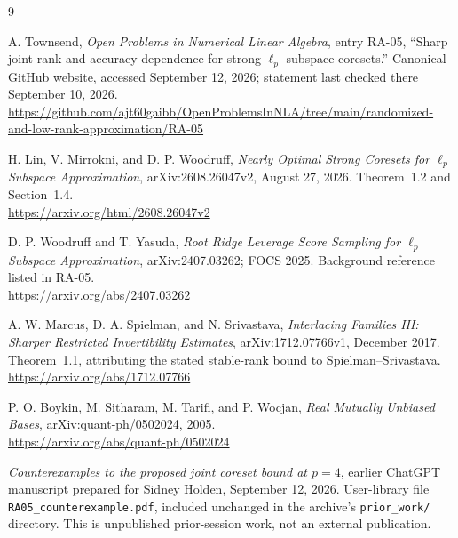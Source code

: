 \documentclass[11pt,letterpaper]{article}
\theoremstyle{definition}
\theoremstyle{remark}
\numberwithin{equation}{section}
\begin{document}
\begin{thebibliography}{9}\raggedright
{}
A. Townsend, \emph{Open Problems in Numerical Linear Algebra}, entry RA-05, ``Sharp joint rank and accuracy dependence for strong $\ell_p$ subspace coresets.'' Canonical GitHub website, accessed September 12, 2026; statement last checked there September 10, 2026.\\
\url{https://github.com/ajt60gaibb/OpenProblemsInNLA/tree/main/randomized-and-low-rank-approximation/RA-05}

H. Lin, V. Mirrokni, and D. P. Woodruff,
\emph{Nearly Optimal Strong Coresets for $\ell_p$ Subspace Approximation},
arXiv:2608.26047v2, August 27, 2026. Theorem~1.2 and Section~1.4.\\
\url{https://arxiv.org/html/2608.26047v2}

D. P. Woodruff and T. Yasuda,
\emph{Root Ridge Leverage Score Sampling for $\ell_p$ Subspace Approximation},
arXiv:2407.03262; FOCS 2025. Background reference listed in RA-05.\\
\url{https://arxiv.org/abs/2407.03262}

A. W. Marcus, D. A. Spielman, and N. Srivastava,
\emph{Interlacing Families III: Sharper Restricted Invertibility Estimates},
arXiv:1712.07766v1, December 2017. Theorem~1.1, attributing the stated stable-rank bound to Spielman--Srivastava.\\
\url{https://arxiv.org/abs/1712.07766}

P. O. Boykin, M. Sitharam, M. Tarifi, and P. Wocjan,
\emph{Real Mutually Unbiased Bases}, arXiv:quant-ph/0502024, 2005.\\
\url{https://arxiv.org/abs/quant-ph/0502024}

\emph{Counterexamples to the proposed joint coreset bound at $p=4$},
earlier ChatGPT manuscript prepared for Sidney Holden, September 12, 2026.
User-library file \texttt{RA05\_counterexample.pdf}, included unchanged in the archive's \texttt{prior\_work/} directory. This is unpublished prior-session work, not an external publication.
\end{thebibliography}
\end{document}
